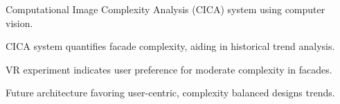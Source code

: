 
\item Computational Image Complexity Analysis (CICA) system using computer vision.
\item CICA system quantifies facade complexity, aiding in historical trend analysis.
\item VR experiment indicates user preference for moderate complexity in facades.
\item Future architecture favoring user-centric, complexity balanced designs trends.
